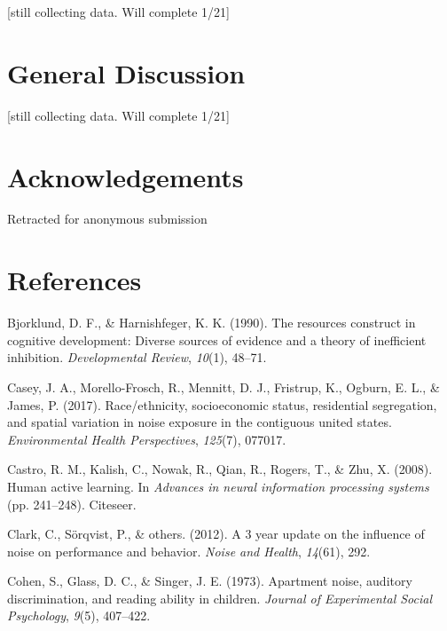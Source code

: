 \documentclass[10pt, letterpaper]{article}
\begin{document}
{[}still collecting data. Will complete 1/21{]}

\hypertarget{general-discussion}{%
\section{\texorpdfstring{\textbf{General
Discussion}}{General Discussion}}\label{general-discussion}}

{[}still collecting data. Will complete 1/21{]}

\hypertarget{acknowledgements}{%
\section{Acknowledgements}\label{acknowledgements}}

Retracted for anonymous submission

\hypertarget{references}{%
\section{References}\label{references}}

\setlength{\parindent}{-0.1in} 
\setlength{\leftskip}{0.125in}

\noindent

\hypertarget{refs}{}
\leavevmode\hypertarget{ref-bjorklund1990}{}%
Bjorklund, D. F., \& Harnishfeger, K. K. (1990). The resources construct
in cognitive development: Diverse sources of evidence and a theory of
inefficient inhibition. \emph{Developmental Review}, \emph{10}(1),
48--71.

\leavevmode\hypertarget{ref-casey2017}{}%
Casey, J. A., Morello-Frosch, R., Mennitt, D. J., Fristrup, K., Ogburn,
E. L., \& James, P. (2017). Race/ethnicity, socioeconomic status,
residential segregation, and spatial variation in noise exposure in the
contiguous united states. \emph{Environmental Health Perspectives},
\emph{125}(7), 077017.

\leavevmode\hypertarget{ref-castro2008}{}%
Castro, R. M., Kalish, C., Nowak, R., Qian, R., Rogers, T., \& Zhu, X.
(2008). Human active learning. In \emph{Advances in neural information
processing systems} (pp. 241--248). Citeseer.

\leavevmode\hypertarget{ref-clark20123}{}%
Clark, C., Sörqvist, P., \& others. (2012). A 3 year update on the
influence of noise on performance and behavior. \emph{Noise and Health},
\emph{14}(61), 292.

\leavevmode\hypertarget{ref-cohen1973}{}%
Cohen, S., Glass, D. C., \& Singer, J. E. (1973). Apartment noise,
auditory discrimination, and reading ability in children. \emph{Journal
of Experimental Social Psychology}, \emph{9}(5), 407--422.
\end{document}
